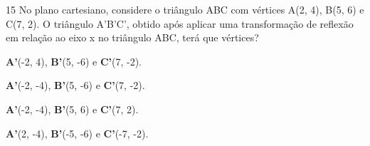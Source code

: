 





\num{15} No plano cartesiano, considere o triângulo ABC com vértices A(2, 4),
B(5, 6) e C(7, 2). O triângulo A'B'C', obtido após aplicar uma transformação de
reflexão em relação ao eixo x no triângulo ABC, terá que vértices?

\begin{escolha}
\item \textbf{A'}(-2, 4), \textbf{B'}(5, -6) e \textbf{C'}(7, -2).
\item \textbf{A'}(-2, -4), \textbf{B'}(5, -6) e \textbf{C'}(7, -2).
\item \textbf{A'}(-2, -4), \textbf{B'}(5, 6) e \textbf{C'}(7, 2).
\item \textbf{A'}(2, -4), \textbf{B'}(-5, -6) e \textbf{C'}(-7, -2).
\end{escolha}





